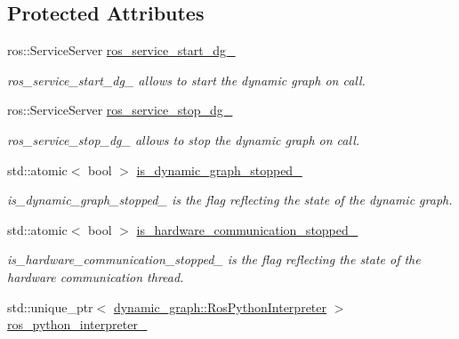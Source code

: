 \subsection*{Protected Attributes}
\begin{DoxyCompactItemize}
\item 
ros\+::\+Service\+Server \hyperlink{classdynamic__graph_1_1DynamicGraphManager_adb99ba3a7a5e677b30531a69bcc922ec}{ros\+\_\+service\+\_\+start\+\_\+dg\+\_\+}
\begin{DoxyCompactList}\small\item\em ros\+\_\+service\+\_\+start\+\_\+dg\+\_\+ allows to start the dynamic graph on call. \end{DoxyCompactList}\item 
ros\+::\+Service\+Server \hyperlink{classdynamic__graph_1_1DynamicGraphManager_adf973b6da4e4fe14cae262ba94ebb191}{ros\+\_\+service\+\_\+stop\+\_\+dg\+\_\+}
\begin{DoxyCompactList}\small\item\em ros\+\_\+service\+\_\+stop\+\_\+dg\+\_\+ allows to stop the dynamic graph on call. \end{DoxyCompactList}\item 
std\+::atomic$<$ bool $>$ \hyperlink{classdynamic__graph_1_1DynamicGraphManager_a87baafbaadf396a7663da653dc5da106}{is\+\_\+dynamic\+\_\+graph\+\_\+stopped\+\_\+}
\begin{DoxyCompactList}\small\item\em is\+\_\+dynamic\+\_\+graph\+\_\+stopped\+\_\+ is the flag reflecting the state of the dynamic graph. \end{DoxyCompactList}\item 
std\+::atomic$<$ bool $>$ \hyperlink{classdynamic__graph_1_1DynamicGraphManager_ab1a2bc0a8f04126638056f430297097e}{is\+\_\+hardware\+\_\+communication\+\_\+stopped\+\_\+}
\begin{DoxyCompactList}\small\item\em is\+\_\+hardware\+\_\+communication\+\_\+stopped\+\_\+ is the flag reflecting the state of the hardware communication thread. \end{DoxyCompactList}\item 
std\+::unique\+\_\+ptr$<$ \hyperlink{classdynamic__graph_1_1RosPythonInterpreter}{dynamic\+\_\+graph\+::\+Ros\+Python\+Interpreter} $>$ \hyperlink{classdynamic__graph_1_1DynamicGraphManager_a40458dd801d1ee7e2051f8b8fab5366b}{ros\+\_\+python\+\_\+interpreter\+\_\+}\hypertarget{classdynamic__graph_1_1DynamicGraphManager_a40458dd801d1ee7e2051f8b8fab5366b}{}\label{classdynamic__graph_1_1DynamicGraphManager_a40458dd801d1ee7e2051f8b8fab5366b}


\end{DoxyCompactItemize}
